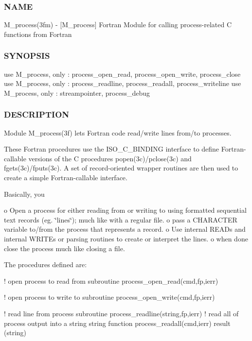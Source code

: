 \subsubsection*{N\+A\+ME}

M\+\_\+process(3fm) -\/ \mbox{[}M\+\_\+process\mbox{]} Fortran Module for calling process-\/related C functions from Fortran 

\subsubsection*{S\+Y\+N\+O\+P\+S\+IS}

\begin{DoxyVerb}use M_process, only : process_open_read, process_open_write, process_close
use M_process, only : process_readline, process_readall, process_writeline
use M_process, only : streampointer, process_debug
\end{DoxyVerb}


\subsubsection*{D\+E\+S\+C\+R\+I\+P\+T\+I\+ON}

Module M\+\_\+process(3f) lets Fortran code read/write lines from/to processes.

These Fortran procedures use the I\+S\+O\+\_\+\+C\+\_\+\+B\+I\+N\+D\+I\+NG interface to define Fortran-\/callable versions of the C procedures popen(3c)/pclose(3c) and fgets(3c)/fputs(3c). A set of record-\/oriented wrapper routines are then used to create a simple Fortran-\/callable interface.

Basically, you

o Open a process for either reading from or writing to using formatted sequential text records (eg. \char`\"{}lines\char`\"{}); much like with a regular file. o pass a C\+H\+A\+R\+A\+C\+T\+ER variable to/from the process that represents a record. o Use internal R\+E\+A\+Ds and internal W\+R\+I\+T\+Es or parsing routines to create or interpret the lines. o when done close the process much like closing a file.

The procedures defined are\+:

! open process to read from subroutine process\+\_\+open\+\_\+read(cmd,fp,ierr)

! open process to write to subroutine process\+\_\+open\+\_\+write(cmd,fp,ierr)

! read line from process subroutine process\+\_\+readline(string,fp,ierr) ! read all of process output into a string string function process\+\_\+readall(cmd,ierr) result (string)

